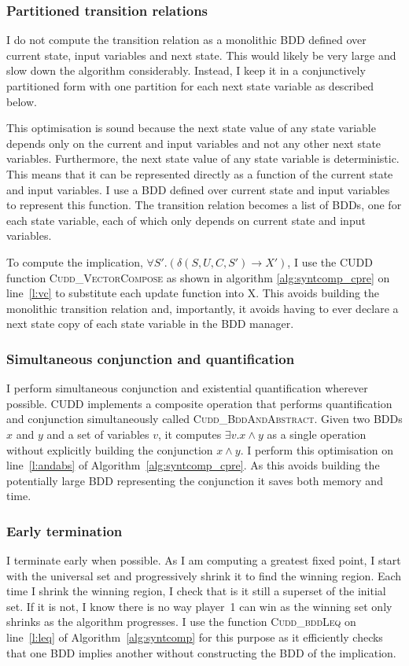 \subsubsection{Partitioned transition relations}
\label{sec:syntcomp_partitioned}
I do not compute the transition relation as a monolithic BDD defined over current state, input variables and next state. This would likely be very large and slow down the algorithm considerably. Instead, I keep it in a conjunctively partitioned form with one partition for each next state variable as described below. 

This optimisation is sound because the next state value of any state variable depends only on the current and input variables and not any other next state variables. Furthermore, the next state value of any state variable is deterministic. This means that it can be represented directly as a function of the current state and input variables. I use a BDD defined over current state and input variables to represent this function. The transition relation becomes a list of BDDs, one for each state variable, each of which only depends on current state and input variables. 

To compute the implication, $\forall S'. (\delta(S, U, C, S') \rightarrow X')$, I use the CUDD function \textsc{Cudd\_VectorCompose} as shown in algorithm \ref{alg:syntcomp_cpre} on line~\ref{l:vc} to substitute each update function into X. This avoids building the monolithic transition relation and, importantly, it avoids having to ever declare a next state copy of each state variable in the BDD manager. 

\subsubsection{Simultaneous conjunction and quantification}
I perform simultaneous conjunction and existential quantification wherever possible. CUDD implements a composite operation that performs quantification and conjunction simultaneously called \textsc{Cudd\_BddAndAbstract}. Given two BDDs $x$ and $y$ and a set of variables $v$, it computes $\exists v. x \land y$ as a single operation without explicitly building the conjunction $x \land y$. I perform this optimisation on line~\ref{l:andabs} of Algorithm~\ref{alg:syntcomp_cpre}. As this avoids building the potentially large BDD representing the conjunction it saves both memory and time.

\subsubsection{Early termination}
I terminate early when possible. As I am computing a greatest fixed point, I start with the universal set and progressively shrink it to find the winning region. Each time I shrink the winning region, I check that is it still a superset of the initial set. If it is not, I know there is no way player~1 can win as the winning set only shrinks as the algorithm progresses. I use the function \textsc{Cudd\_bddLeq} on line~\ref{l:leq} of Algorithm~\ref{alg:syntcomp} for this purpose as it efficiently checks that one BDD implies another without constructing the BDD of the implication.

